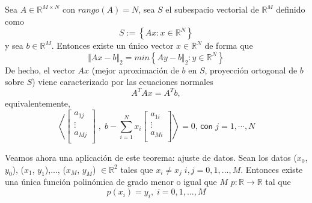 \begin{nth}
Sea $A \in \mathbb{R}^{M \times N}$ con $rango(A) = N$, sea $S$ el subespacio vectorial de $\mathbb{R}^M$ definido como
\[ S:= \left\lbrace Ax : x \in \mathbb{R}^N \right\rbrace \]
y sea $b \in \mathbb{R}^M$. Entonces existe un único vector $x \in \mathbb{R}^N$ de forma que
\[ \Vert Ax-b \Vert _2 = min \left\lbrace Ay-b \Vert _2 : y \in \mathbb{R}^N \right\rbrace \]
De hecho, el vector $Ax$ (mejor aproximación de $b$ en $S$, proyección ortogonal de $b$ sobre $S$) viene caracterizado por las ecuaciones normales
\[ A^TAx = A^Tb, \]
equivalentemente,
\[ \left\langle \begin{bmatrix}
a_{1j} \\
\vdots \\
a_{Mj} \\
\end{bmatrix}
\; , \;
b-\sum_{i=1}^N x_i \begin{bmatrix}
a_{1i} \\
\vdots \\
a_{Mi} \\
\end{bmatrix}
\right\rangle = 0 \textsf{, con } j=1,\cdots,N \]
\end{nth}

Veamos ahora una aplicación de este teorema: ajuste de datos. Sean los datos ($x_0$, $y_0$), ($x_1$, $y_1$),..., ($x_M$, $y_M$) $\in \mathbb{R}^2$ tales que $x_i \neq x_j \; i,j=0,1,...,M$. Entonces existe una única función polinómica de grado menor o igual que $M$ $p: \mathbb{R} \longrightarrow \mathbb{R}$ tal que
\[ p(x_i) = y_i, \; i=0,1,...,M \]

